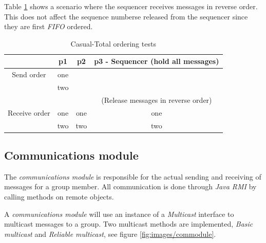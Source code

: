 \documentclass[titlepage, twocolumn, a4paper, 10pt]{article}
\begin{document}
Table \ref{tbl:castot} shows a scenario where the sequencer receives messages in reverse order. This does not affect the sequence numberse released from the sequencer since they are first \textit{FIFO} ordered.

\begin{table}[H]
  \centering
  \begin{footnotesize}
    \begin{tabular} {c | c | c | c}
      & p1 & p2 & p3 - Sequencer (hold all messages) \\
      \hline
      Send order & one &  &  \\
      & two &  &  \\
      \hline
      &  &  & (Release messages in reverse order) \\
      \hline
      Receive order & one & one & one \\
      & two & two & two \\
    \end{tabular}
  \end{footnotesize}
  \caption{Casual-Total ordering tests}
  \label{tbl:castot}
\end{table}

\subsection{Communications module}\label{sec:communications-module}
The \textit{communications module} is responsible for the actual
sending and receiving of messages for a group member. All
communication is done through \textit{Java RMI} by calling methods on
remote objects.

A \textit{communications module} will use an instance of a
\textit{Multicast} interface to multicast messages to a group. Two
multicast methods are implemented, \textit{Basic multicast} and
\textit{Reliable multicast}, see figure \ref{fig:images/commodule}.
\end{document}

